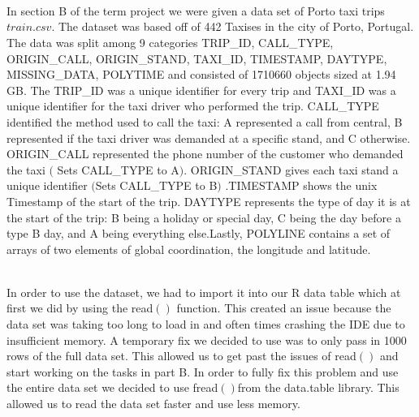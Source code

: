 \documentclass[11pt]{article}
\begin{document}
\\ \\
\\

\par
	In section B of the term project we were given a data set of Porto taxi trips \(train.csv\).
 The dataset was based off of 442 Taxises in the city of Porto, Portugal. The data was split among 9
 categories TRIP\_ID, CALL\_TYPE, ORIGIN\_CALL, ORIGIN\_STAND, TAXI\_ID, TIMESTAMP, DAYTYPE, MISSING\_DATA,
 POLYTIME and consisted of 1710660 objects sized at 1.94 GB. The TRIP\_ID was a unique identifier for
every trip and TAXI\_ID was a unique identifier for the taxi driver who performed the trip. CALL\_TYPE
 identified the method used to call the taxi: \textsc{}A\textsc{} represented a call from central,
 \textsc{}B\textsc{} represented if the taxi driver was demanded at a specific stand, and 
\textsc{}C\textsc{} otherwise. ORIGIN\_CALL represented the phone number of the customer who
 demanded the taxi $($ Sets CALL\_TYPE to \textsc{}A\textsc{}$)$. ORIGIN\_STAND gives each taxi
 stand a unique identifier $($Sets CALL\_TYPE to \textsc{}B\textsc{}$)$ .TIMESTAMP shows the unix
 Timestamp of the start of the trip. DAYTYPE represents the type of day it is at the start of the trip: \textsc{}B
\textsc{} being a holiday or special day, \textsc{}C\textsc{} being the day before a type
 \textsc{}B\textsc{} day, and \textsc{}A\textsc{} being everything else.Lastly,
 POLYLINE contains a set of arrays of two elements of global coordination, the longitude and latitude.\\

\\
\par
	 In order to use the dataset, we had to import it into our R data table which at first we did by using the read$()$
 function. This created an issue because the data set was taking too long to load in and often times crashing the
 IDE due to insufficient memory. A temporary fix we decided to use was to only pass in 1000 rows of the full data 
set. This allowed us to get past the issues of read$()$ and start working on the tasks in part B. In order to fully
 fix this problem and use the entire data set we decided to use fread$()$from the data.table library. This allowed
 us to read the data set faster and use less memory.\\
\end{document}
